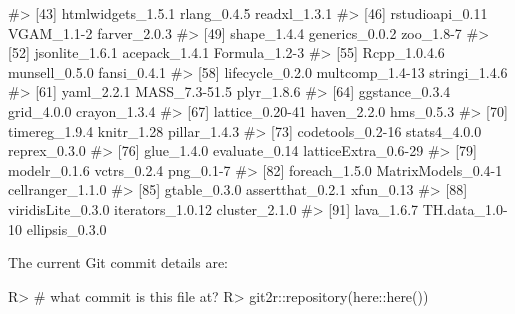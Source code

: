 \documentclass[
]{jss}
\begin{document}
\begin{CodeChunk}
\begin{CodeOutput}
#> [43] htmlwidgets_1.5.1   rlang_0.4.5         readxl_1.3.1       
#> [46] rstudioapi_0.11     VGAM_1.1-2          farver_2.0.3       
#> [49] shape_1.4.4         generics_0.0.2      zoo_1.8-7          
#> [52] jsonlite_1.6.1      acepack_1.4.1       Formula_1.2-3      
#> [55] Rcpp_1.0.4.6        munsell_0.5.0       fansi_0.4.1        
#> [58] lifecycle_0.2.0     multcomp_1.4-13     stringi_1.4.6      
#> [61] yaml_2.2.1          MASS_7.3-51.5       plyr_1.8.6         
#> [64] ggstance_0.3.4      grid_4.0.0          crayon_1.3.4       
#> [67] lattice_0.20-41     haven_2.2.0         hms_0.5.3          
#> [70] timereg_1.9.4       knitr_1.28          pillar_1.4.3       
#> [73] codetools_0.2-16    stats4_4.0.0        reprex_0.3.0       
#> [76] glue_1.4.0          evaluate_0.14       latticeExtra_0.6-29
#> [79] modelr_0.1.6        vctrs_0.2.4         png_0.1-7          
#> [82] foreach_1.5.0       MatrixModels_0.4-1  cellranger_1.1.0   
#> [85] gtable_0.3.0        assertthat_0.2.1    xfun_0.13          
#> [88] viridisLite_0.3.0   iterators_1.0.12    cluster_2.1.0      
#> [91] lava_1.6.7          TH.data_1.0-10      ellipsis_0.3.0
\end{CodeOutput}
\end{CodeChunk}

The current Git commit details are:

\begin{CodeChunk}

\begin{CodeInput}
R> # what commit is this file at?
R> git2r::repository(here::here())
\end{CodeInput}

\end{CodeChunk}


\end{document}
